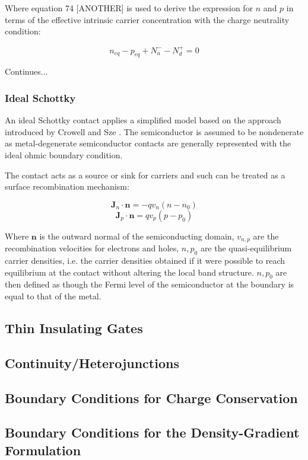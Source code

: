 Where equation 74 [ANOTHER] is used to derive the expression for $n$ and $p$ in terms of the effective intrinsic carrier concentration with the charge neutrality condition:

\begin{equation}
	n_{eq}-p_{eq}+N_{a}^{-}-N_{d}^{+}=0
\end{equation}

Continues...
\subsubsection{Ideal Schottky}
An ideal Schottky contact applies a simplified model based on the approach introduced by Crowell and Sze \cite{crowell:1966}. The semiconductor is assumed to be nondenerate as metal-degenerate semiconductor contacts are generally represented with the ideal ohmic boundary condition.

The contact acts as a source or sink for carriers and such can be treated as a surface recombination mechanism:

\begin{equation}
	\bm{J}_{n}\cdot\bm{n}=-qv_{n}\left(n-n_{0}\right)
\end{equation}
\begin{equation}
\bm{J}_{p}\cdot\bm{n}=qv_{p}\left(p-p_{0}\right)
\end{equation}

Where $\bm{n}$ is the outward normal of the semiconducting domain, $v_{n,p}$ are the recombination velocities for electrons and holes, $n,p_{0}$ are the quasi-equilibrium carrier densities, i.e. the carrier densities obtained if it were possible to reach equilibrium at the  contact without altering the local band structure. $n,p_{0}$ are then defined as though the Fermi level of the semiconductor at the boundary is equal to that of the metal. 
\subsection{Thin Insulating Gates}
\subsection{Continuity/Heterojunctions}
\subsection{Boundary Conditions for Charge Conservation}
\subsection{Boundary Conditions for the Density-Gradient Formulation}

